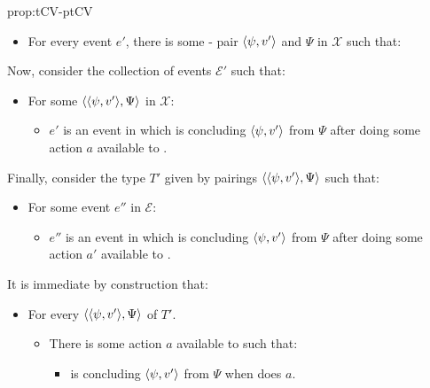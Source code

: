 \begin{note}
\begin{argument}{prop:tCV-ptCV}
    \begin{itemize}[noitemsep]
    \item
      For every event \(e'\), there is some -\val{} pair \(\langle \psi, v' \rangle\) and  \(\Psi\) in \(\mathcal{X}\) such that:
    \end{itemize}

    \noindent%
    Now, consider the collection of events \(\mathcal{E}'\) such that:
    \begin{itemize}[noitemsep]
    \item
      For some \(\langle \langle \psi, v' \rangle, \Psi \rangle\) in \(\mathcal{X}\):
      \begin{itemize}[noitemsep]
      \item
        \(e'\) is an event in which \vAgent{} is concluding \(\langle \psi, v' \rangle\) from \(\Psi\) after doing some action \(a\) available to \vAgent{}.
      \end{itemize}
    \end{itemize}

    \noindent%
    Finally, consider the type \(T'\) given by pairings \(\langle \langle \psi, v' \rangle, \Psi \rangle\) such that:
    \begin{itemize}[noitemsep]
    \item
      For some event \(e''\) in \(\mathcal{E}\):
      \begin{itemize}[noitemsep]
      \item
        \(e''\) is an event in which \vAgent{} is concluding \(\langle \psi, v' \rangle\) from \(\Psi\) after doing some action \(a'\) available to \vAgent{}.
      \end{itemize}
    \end{itemize}

    \noindent%
    It is immediate by construction that:
    \begin{itemize}[noitemsep]
    \item
      For every \tI{} \(\langle \langle \psi, v' \rangle, \Psi \rangle\) of \(T'\).
      \begin{itemize}[noitemsep]
      \item
        There is some action \(a\) available to \vAgent{} such that:
        \begin{itemize}
        \item
          \vAgent{} is concluding \(\langle \psi, v' \rangle\) from \(\Psi\) when \vAgent{} does \(a\).
        \end{itemize}
      \end{itemize}
    \end{itemize}
    \vspace{-\baselineskip}
  \end{argument}
\end{note}

